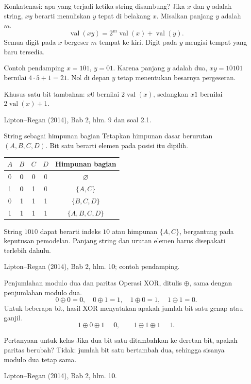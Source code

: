 \documentclass[aspectratio=169,11pt]{beamer}
\newcommand{\bookref}[1]{\par\vfill{\scriptsize\color{gray}Lipton--Regan (2014), Bab 2, #1.}}
\begin{document}
\begin{frame}{Konkatenasi: apa yang terjadi ketika string disambung?}
Jika $x$ dan $y$ adalah string, $xy$ berarti menuliskan $y$ tepat di belakang $x$. Misalkan panjang $y$ adalah $m$.
\[
\operatorname{val}(xy)=2^m\operatorname{val}(x)+\operatorname{val}(y).
\]
Semua digit pada $x$ bergeser $m$ tempat ke kiri. Digit pada $y$ mengisi tempat yang baru tersedia.
\begin{exampleblock}{Contoh pendamping}
$x=101$, $y=01$. Karena panjang $y$ adalah dua, $xy=10101$ bernilai $4\cdot5+1=21$. Nol di depan $y$ tetap menentukan besarnya pergeseran.
\end{exampleblock}
Khusus satu bit tambahan: $x0$ bernilai $2\operatorname{val}(x)$, sedangkan $x1$ bernilai $2\operatorname{val}(x)+1$.
\bookref{hlm. 9 dan soal 2.1}
\end{frame}

\begin{frame}{String sebagai himpunan bagian}
Tetapkan himpunan dasar berurutan $(A,B,C,D)$. Bit satu berarti elemen pada posisi itu dipilih.
\begin{center}
\begin{tabular}{ccccc}\toprule
$A$ & $B$ & $C$ & $D$ & Himpunan bagian\\\midrule
0&0&0&0& $\varnothing$\\
1&0&1&0& $\{A,C\}$\\
0&1&1&1& $\{B,C,D\}$\\
1&1&1&1& $\{A,B,C,D\}$\\\bottomrule
\end{tabular}\end{center}
String $1010$ dapat berarti indeks $10$ atau himpunan $\{A,C\}$, bergantung pada keputusan pemodelan. Panjang string dan urutan elemen harus disepakati terlebih dahulu.
\bookref{hlm. 10; contoh pendamping}
\end{frame}

\begin{frame}{Penjumlahan modulo dua dan paritas}
Operasi XOR, ditulis $\oplus$, sama dengan penjumlahan modulo dua.
\[
0\oplus0=0,\quad 0\oplus1=1,\quad 1\oplus0=1,\quad 1\oplus1=0.
\]
Untuk beberapa bit, hasil XOR menyatakan apakah jumlah bit satu genap atau ganjil.
\[
1\oplus0\oplus1=0,\qquad 1\oplus1\oplus1=1.
\]
\begin{block}{Pertanyaan untuk kelas}
Jika dua bit satu ditambahkan ke deretan bit, apakah paritas berubah? Tidak: jumlah bit satu bertambah dua, sehingga sisanya modulo dua tetap sama.
\end{block}
\bookref{hlm. 10}
\end{frame}
\end{document}
